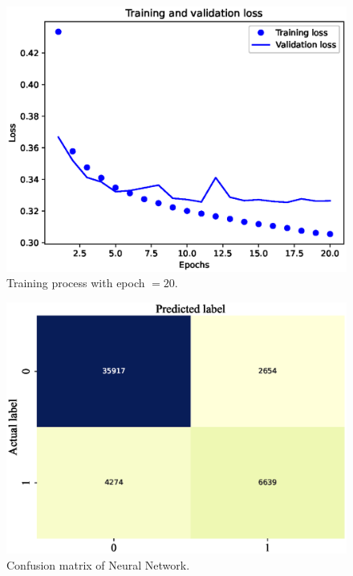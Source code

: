 \documentclass[11pt, a4paper, jou]{apa7}
\begin{document}
\begin{figure}[h]
    \centering
    \caption{Training process with epoch $=20$. }\label{fig:NN_process_20}
    \includegraphics[width=.45\textwidth]{figures/error_20.eps}
\end{figure}

\begin{figure}[h]
    \centering
    \caption{Confusion matrix of Neural Network. }\label{fig:FC_confusion_matrix}
    \includegraphics[width=.45\textwidth]{figures/FC_confusion_matrix.eps}
\end{figure}

\begin{table}[h]
    \centering
    \caption{Classification results of Neural Network on the test set. }
    \label{tab:FC_summary}
\end{table}
\end{document}
